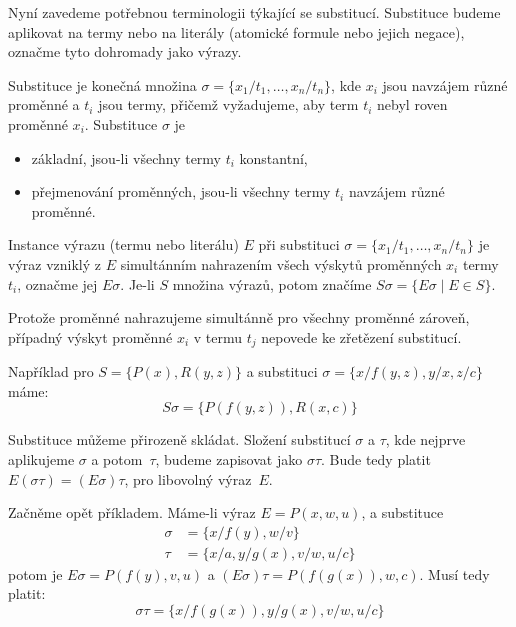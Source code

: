Nyní zavedeme potřebnou terminologii týkající se substitucí. Substituce budeme aplikovat na termy nebo na literály (atomické formule nebo jejich negace), označme tyto dohromady jako \alert{výrazy}. 

\begin{definition}[Substituce]
    \alert{Substituce} je konečná množina $\sigma=\{x_1/t_1,\dots,x_n/t_n\}$, kde $x_i$ jsou navzájem různé proměnné a $t_i$ jsou termy, přičemž vyžadujeme, aby term $t_i$ nebyl roven proměnné $x_i$. Substituce $\sigma$ je 
    \begin{itemize}
        \item \alert{základní}, jsou-li všechny termy $t_i$ konstantní,
        \item \alert{přejmenování proměnných}, jsou-li všechny termy $t_i$ navzájem různé proměnné.
    \end{itemize}
    \alert{Instance} výrazu (termu nebo literálu) $E$ \alert{při substituci $\sigma=\{x_1/t_1,\dots,x_n/t_n\}$} je výraz vzniklý z $E$ simultánním nahrazením všech výskytů proměnných $x_i$ termy $t_i$, označme jej $E\sigma$. Je-li $S$ množina výrazů, potom značíme $S\sigma=\{E\sigma\mid E\in S\}$.
\end{definition}

Protože proměnné nahrazujeme \alert{simultánně} pro všechny proměnné zároveň, případný výskyt proměnné $x_i$ v termu $t_j$ nepovede ke zřetězení substitucí.

\begin{example}
Například pro $S=\{P(x),R(y,z)\}$ a substituci $\sigma=\{x/f(y,z),y/x,z/c\}$ máme:
$$
S\sigma=\{P(f(y,z)),R(x,c)\}
$$
\end{example}

Substituce můžeme přirozeně \alert{skládat}. Složení substitucí $\sigma$ a $\tau$, kde nejprve aplikujeme $\sigma$ a potom~$\tau$, budeme zapisovat jako $\sigma\tau$. Bude tedy platit $E(\sigma\tau)=(E\sigma)\tau$, pro libovolný výraz~$E$.

\begin{example}\label{example:compose-substitutions}
    Začněme opět příkladem. Máme-li výraz $E=P(x,w,u)$, a substituce \begin{align*}
        \sigma&=\{x/f(y),w/v\}\\
        \tau&=\{x/a,y/g(x),v/w,u/c\}
    \end{align*}
    potom je $E\sigma=P(f(y),v,u)$ a $(E\sigma)\tau=P(f(g(x)),w,c)$.
    Musí tedy platit: 
    $$
    \sigma\tau=\{x/f(g(x)),y/g(x),v/w,u/c\}
    $$
\end{example}

